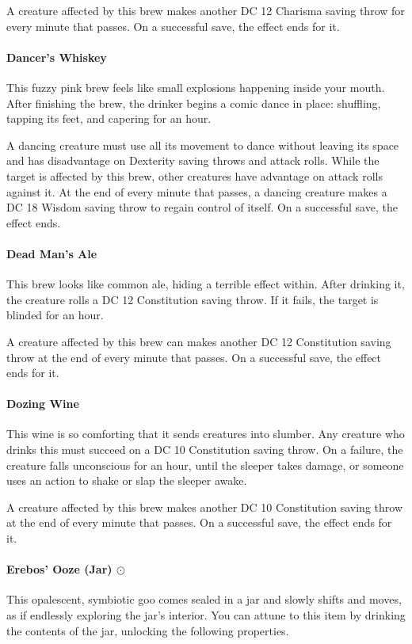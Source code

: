         A creature affected by this brew makes another DC 12 Charisma saving throw for every minute that passes.
        On a successful save, the effect ends for it.
    \paragraph{Dancer's Whiskey} %
        This fuzzy pink brew feels like small explosions happening inside your mouth.
        After finishing the brew, the drinker begins a comic dance in place: shuffling, tapping its feet, and capering for an hour.

        A dancing creature must use all its movement to dance without leaving its space and has disadvantage on Dexterity saving throws and attack rolls.
        While the target is affected by this brew, other creatures have advantage on attack rolls against it.
        At the end of every minute that passes, a dancing creature makes a DC 18 Wisdom saving throw to regain control of itself.
        On a successful save, the effect ends.
    \paragraph{Dead Man's Ale} %
        This brew looks like common ale, hiding a terrible effect within.
        After drinking it, the creature rolls a DC 12 Constitution saving throw.
        If it fails, the target is blinded for an hour.

        A creature affected by this brew can makes another DC 12 Constitution saving throw at the end of every minute that passes.
        On a successful save, the effect ends for it.
    \paragraph{Dozing Wine} %
        This wine is so comforting that it sends creatures into slumber.
        Any creature who drinks this must succeed on a DC 10 Constitution saving throw.
        On a failure, the creature falls unconscious for an hour, until the sleeper takes damage, or someone uses an action to shake or slap the sleeper awake.

        A creature affected by this brew makes another DC 10 Constitution saving throw at the end of every minute that passes.
        On a successful save, the effect ends for it.
    \paragraph{Erebos' Ooze (Jar) $\odot$} \label{item::erebosooze} %
        This opalescent, symbiotic goo comes sealed in a jar and slowly shifts and moves, as if endlessly exploring the jar's interior.
        You can attune to this item by drinking the contents of the jar, unlocking the following properties.


